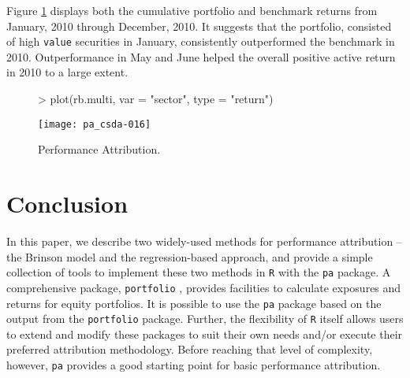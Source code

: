 Figure \ref{figure:regmultiattrib} displays both the cumulative
portfolio and benchmark returns from January, 2010 through December,
2010. It suggests that the portfolio, consisted of high \texttt{value}
securities in January, consistently outperformed the benchmark in
2010. Outperformance in May and June helped the overall positive
active return in 2010 to a large extent.

\begin{figure}
\centering
\vspace*{.1in}
\begin{Schunk}
\begin{Sinput}
> plot(rb.multi, var = "sector", type = "return")
\end{Sinput}
\end{Schunk}
\texttt{[image: pa\_csda-016]}
\caption{\label{figure:regmultiattrib}
  Performance Attribution.}
\end{figure}


\section{Conclusion}

In this paper, we describe two widely-used methods for performance
attribution -- the Brinson model and the regression-based approach,
and provide a simple collection of tools to implement these two
methods in \texttt{R} with the \texttt{pa} package.  A
comprehensive package, \texttt{portfolio} \cite{kane:david}, provides
facilities to calculate exposures and returns for equity
portfolios. It is possible to use the \texttt{pa} package based on the
output from the \texttt{portfolio} package. Further, the flexibility
of \texttt{R} itself allows users to extend and modify these packages
to suit their own needs and/or execute their preferred attribution
methodology. Before reaching that level of complexity, however,
\texttt{pa} provides a good starting point for basic performance
attribution.


